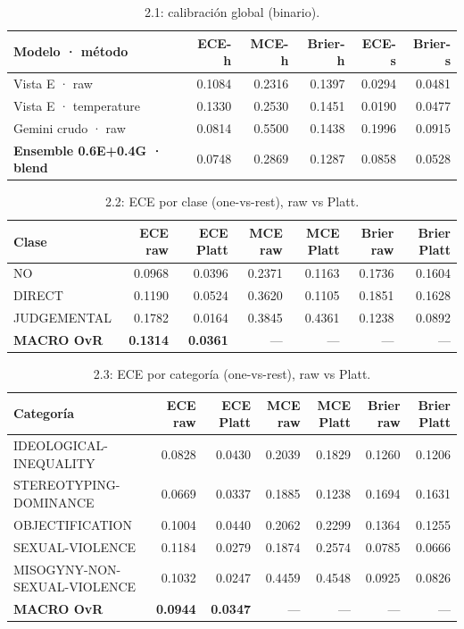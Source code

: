 \documentclass[11pt,a4paper]{article}
\newcommand{\best}[1]{\textbf{#1}}
\begin{document}
\begin{table}[h]\centering\small
\caption{2.1: calibración global (binario).}
\begin{tabular}{@{}lrrrrr@{}}
\toprule
Modelo · método & ECE-h & MCE-h & Brier-h & ECE-s & Brier-s \\
\midrule
Vista E · raw           & 0.1084 & 0.2316 & 0.1397 & 0.0294 & 0.0481 \\
Vista E · temperature   & 0.1330 & 0.2530 & 0.1451 & 0.0190 & 0.0477 \\
Gemini crudo · raw      & 0.0814 & 0.5500 & 0.1438 & 0.1996 & 0.0915 \\
\best{Ensemble 0.6E+0.4G · blend} & 0.0748 & 0.2869 & 0.1287 & 0.0858 & 0.0528 \\
\bottomrule
\end{tabular}
\end{table}

\begin{table}[h]\centering\small
\caption{2.2: ECE por clase (one-vs-rest), raw vs Platt.}
\begin{tabular}{@{}lrrrrrr@{}}
\toprule
Clase & ECE raw & ECE Platt & MCE raw & MCE Platt & Brier raw & Brier Platt \\
\midrule
NO          & 0.0968 & 0.0396 & 0.2371 & 0.1163 & 0.1736 & 0.1604 \\
DIRECT      & 0.1190 & 0.0524 & 0.3620 & 0.1105 & 0.1851 & 0.1628 \\
JUDGEMENTAL & 0.1782 & 0.0164 & 0.3845 & 0.4361 & 0.1238 & 0.0892 \\
\best{MACRO OvR} & \best{0.1314} & \best{0.0361} & --- & --- & --- & --- \\
\bottomrule
\end{tabular}
\end{table}

\begin{table}[h]\centering\small
\caption{2.3: ECE por categoría (one-vs-rest), raw vs Platt.}
\begin{tabular}{@{}lrrrrrr@{}}
\toprule
Categoría & ECE raw & ECE Platt & MCE raw & MCE Platt & Brier raw & Brier Platt \\
\midrule
IDEOLOGICAL-INEQUALITY       & 0.0828 & 0.0430 & 0.2039 & 0.1829 & 0.1260 & 0.1206 \\
STEREOTYPING-DOMINANCE       & 0.0669 & 0.0337 & 0.1885 & 0.1238 & 0.1694 & 0.1631 \\
OBJECTIFICATION              & 0.1004 & 0.0440 & 0.2062 & 0.2299 & 0.1364 & 0.1255 \\
SEXUAL-VIOLENCE              & 0.1184 & 0.0279 & 0.1874 & 0.2574 & 0.0785 & 0.0666 \\
MISOGYNY-NON-SEXUAL-VIOLENCE & 0.1032 & 0.0247 & 0.4459 & 0.4548 & 0.0925 & 0.0826 \\
\best{MACRO OvR} & \best{0.0944} & \best{0.0347} & --- & --- & --- & --- \\
\bottomrule
\end{tabular}
\end{table}
\end{document}
